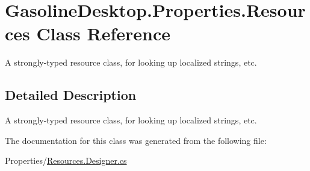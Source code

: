 \hypertarget{class_gasoline_desktop_1_1_properties_1_1_resources}{}\section{Gasoline\+Desktop.\+Properties.\+Resources Class Reference}
\label{class_gasoline_desktop_1_1_properties_1_1_resources}


A strongly-\/typed resource class, for looking up localized strings, etc.  




\subsection{Detailed Description}
A strongly-\/typed resource class, for looking up localized strings, etc. 



The documentation for this class was generated from the following file\+:\begin{DoxyCompactItemize}
\item 
Properties/\mbox{\hyperlink{_resources_8_designer_8cs}{Resources.\+Designer.\+cs}}\end{DoxyCompactItemize}
